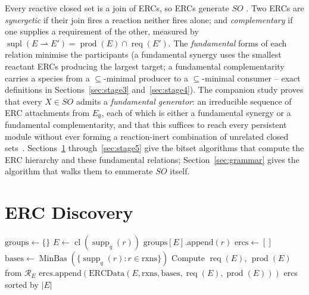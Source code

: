 \documentclass[11pt]{article}
\theoremstyle{plain}
\theoremstyle{remark}
\newcommand{\supp}{\operatorname{supp}}
\newcommand{\prods}{\operatorname{prod}}
\newcommand{\cl}{\operatorname{cl}}
\newcommand{\MinBas}{\operatorname{MinBas}}
\newcommand{\req}{\operatorname{req}}
\newcommand{\supl}{\operatorname{supl}}
\newcommand{\R}{\mathcal{R}}
\newcommand{\SO}{\mathit{SO}}
\begin{document}
Every reactive closed set is a join of ERCs, so ERCs generate $\SO$
\cite{BMBcompanion}. Two ERCs are \emph{synergetic} if their join fires a
reaction neither fires alone; and \emph{complementary} if one supplies a
requirement of the other, measured by
$\supl(E \rightharpoonup E') = \prods(E) \cap \req(E')$. The
\emph{fundamental} forms of each relation minimise the participants (a
fundamental synergy uses the smallest reactant ERCs producing the largest
target; a fundamental complementarity carries a species from a
$\subseteq$-minimal producer to a $\subseteq$-minimal consumer -- exact
definitions in Sections~\ref{sec:stage3} and~\ref{sec:stage4}). The
companion study proves that every $X \in \SO$ admits a \emph{fundamental
generator}: an irreducible sequence of ERC attachments from
$E_\emptyset$, each of which is either a fundamental synergy or a
fundamental complementarity, and that this suffices to reach every
persistent module without ever forming a reaction-inert combination of
unrelated closed sets~\cite{BMBcompanion}. Sections~\ref{sec:stage1}
through~\ref{sec:stage5} give the bitset algorithms that compute the ERC
hierarchy and these fundamental relations; Section~\ref{sec:grammar} gives
the algorithm that walks them to enumerate $\SO$ itself.

\section{ERC Discovery}\label{sec:stage1}

\begin{algorithm}[t]
\caption{ComputeERCs($\R$, $E_0$)}\label{alg:ercs}
\begin{algorithmic}[1]
\State $\text{groups} \leftarrow \{\}$ 
\For{each $r \in \R$ with $\supp_q(r) \neq \emptyset$}
  \State $E \leftarrow \cl(\supp_q(r))$
  \State $\text{groups}[E].\text{append}(r)$
\EndFor
\State $\text{ercs} \leftarrow []$
  \State $\text{bases} \leftarrow \MinBas(\{\supp_q(r) : r \in \text{rxns}\})$
  \State Compute $\req(E)$, $\prods(E)$ from $\R_E$
  \State $\text{ercs.append}(\text{ERCData}(E, \text{rxns}, \text{bases}, \req(E), \prods(E)))$
\EndFor
\State \Return ercs sorted by $|E|$
\end{algorithmic}
\end{algorithm}
\end{document}
